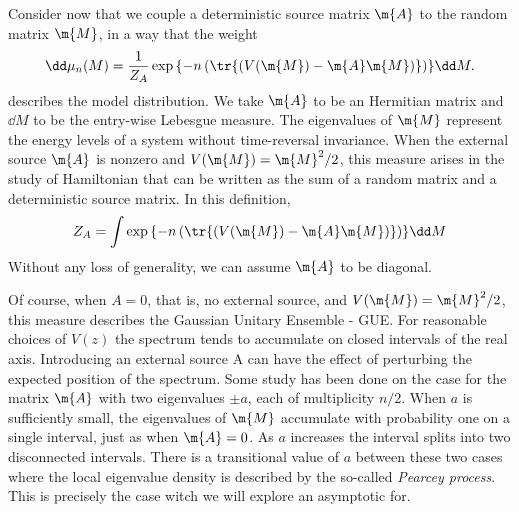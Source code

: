 Consider now that we couple a deterministic source matrix $\m{A}$ to the random matrix $\m{M}$, in a way that the weight
\begin{equation}
	\dd \mu_n(M) = \frac{1}{Z_A} \exp{\left\{-n \left( \tr{\left(V(\m{M})-  \m{A}\m{M} \right)}\right)\right\} } \dd M.
\end{equation}
describes the model distribution. We take $\m{A}$ to be an Hermitian matrix and $\dd M$ to be the entry-wise Lebesgue measure. The eigenvalues of $\m{M}$ represent the energy levels of a system without time-reversal invariance. When the external source $\m{A}$ is nonzero and $V(\m{M}) = \m{M}^2 / 2$, this measure arises in the study of Hamiltonian that can be written as the sum of a random matrix and a deterministic source matrix. In this definition,
\begin{equation}
	Z_A = \int  \exp{\left\{-n \left( \tr{\left(V(\m{M})-  \m{A}\m{M} \right)}\right)\right\} } \dd M
\end{equation}
Without any loss of generality, we can assume $\m{A}$ to be diagonal.

Of course,  when $A = 0$, that is, no external source, and $V(\m{M}) = \m{M}^2/2$, this measure describes the Gaussian Unitary Ensemble - GUE. For reasonable choices of $V(z)$ the spectrum tends to accumulate on closed intervals of the real axis. Introducing an external source A can have the effect of perturbing the expected position of the spectrum. Some study has been done on the case for the matrix $\m{A}$ with two eigenvalues $\pm a$, each of multiplicity $n/2$. When $a$ is sufficiently small, the eigenvalues of $\m{M}$ accumulate with probability one on a single interval, just as when $\m{A} = 0$. As $a$ increases the interval splits into two disconnected intervals. There is a transitional value of $a$ between these two cases where the local eigenvalue density is described by the so-called \textit{Pearcey process}. This is precisely the case witch we will explore an asymptotic for.

